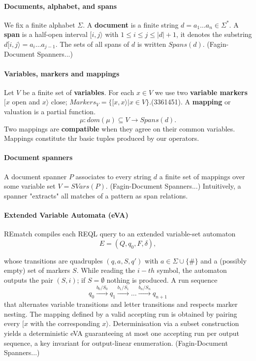 
\medskip
\noindent
\paragraph{Documents, alphabet, and spans} We fix a finite alphabet $\Sigma$. A \textbf{document} is a finite string $d = a_1 \dots a_n \in \Sigma^{*}$. A \textbf{span} is a half-open interval $[i, j \rangle$ with $1 \leq i \leq j \leq |d| +1$, it denotes the substring $d[i, j\rangle = a_i\dots a_{j-1}$. The sets of all spans of $d$ is written $Spans(d)$. (Fagin-Document Spanners...)

\paragraph{Variables, markers and mappings} Let $V$ be a finite set of \textbf{variables}. For each $x\in V$ we use two \textbf{variable markers} $[x$ open and $x\rangle$ close; $Markers_V = \{ [x,x\rangle | x \in V\}$.(3361451). A \textbf{mapping} or valuation is a partial function.
$$
\mu : dom(\mu) \subseteq V \rightarrow Spans(d).
$$
Two mappings are \textbf{compatible} when they agree on their common variables. Mappings constitute thr basic tuples produced by our operators.

\paragraph{Document spanners} A document spanner $P$ associates to every string $d$ a finite set of mappings over some variable set $V = SVars(P)$. (Fagin-Document Spanners...) Intuitively, a spanner "extracts" all matches of a pattern as span relations.

\paragraph{Extended Variable Automata (eVA)} REmatch compiles each REQL query to an extended variable-set automaton 
$$
E = (Q, q_0, F, \delta),
$$

whose transitions are quadruples $(q, a, S, q')$ with $a \in \Sigma \cup \{\#\}$ and a (possibly empty) set of markers $S$. While reading the $i-th$ symbol, the automaton outputs the pair $(S,i)$; if $S = \emptyset$ nothing is produced. A run sequence
$$
q_0 \xrightarrow{b_0/S_0} q_1 \xrightarrow{b_1/S_1} \dots \xrightarrow{b_n/S_n} q_{n+1}
$$
that alternates variable transitions and letter transitions and respects marker nesting. The mapping defined by a valid accepting run is obtained by pairing every $[x$ with the corresponding $x\rangle$. Determinisation via a subset construction yields a deterministic eVA guaranteeing at most one accepting run per output sequence, a key invariant for output-linear enumeration. (Fagin-Document Spanners...)

